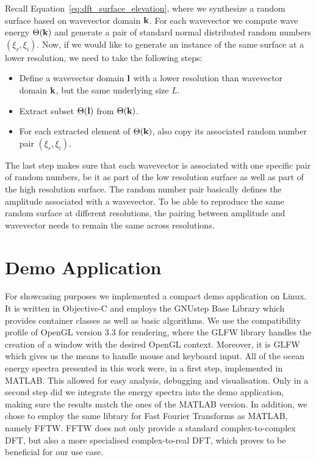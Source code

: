 Recall Equation~\ref{eq:dft_surface_elevation}, where we synthesize a random
surface based on wavevector domain $\mathbf{k}$. For each wavevector we compute
wave energy $\Theta(\mathbf{k})$ and generate a pair of standard normal
distributed random numbers $(\xi_r,\xi_i)$. Now, if we would like to generate
an instance of the same surface at a lower resolution, we need to take the
following steps:
\begin{itemize}
 \item Define a wavevector domain $\mathbf{l}$ with a lower resolution than
 wavevector domain $\mathbf{k}$, but the same underlying size $L$.
 \item Extract subset $\Theta(\mathbf{l})$ from $\Theta(\mathbf{k})$.
 \item For each extracted element of $\Theta(\mathbf{k})$, also copy its
 associated random number pair $(\xi_r,\xi_i)$.
\end{itemize}
The last step makes sure that each wavevector is associated with one specific
pair of random numbers, be it as part of the low resolution surface as well as
part of the high resolution surface. The random number pair basically defines
the amplitude associated with a wavevector. To be able to reproduce the same
random surface at different resolutions, the pairing between amplitude and
wavevector needs to remain the same across resolutions.

\section{Demo Application}
For showcasing purposes we implemented a compact demo application on Linux.
It is written in Objective-C and employs the GNUstep\cite{misc:gnustep}
Base Library which provides container classes as well as basic algorithms.
We use the compatibility profile of OpenGL\cite{misc:opengl} version 3.3
\cite{misc:opengl33} for rendering, where the GLFW library\cite{misc:glfw}
handles the creation of a window with the desired OpenGL context. Moreover,
it is GLFW which gives us the means to handle mouse and keyboard input.
All of the ocean energy spectra presented in this work were, in a first step,
implemented in MATLAB\cite{misc:matlab}. This allowed for easy analysis,
debugging and visualisation. Only in a second step did we integrate the energy
spectra into the demo application, making sure the results match the ones of
the MATLAB version. In addition, we chose to employ the same library for
Fast Fourier Transforms as MATLAB, namely FFTW\cite{misc:fftw}. FFTW does
not only provide a standard complex-to-complex DFT, but also a more specialised
complex-to-real DFT, which proves to be beneficial for our use case.

